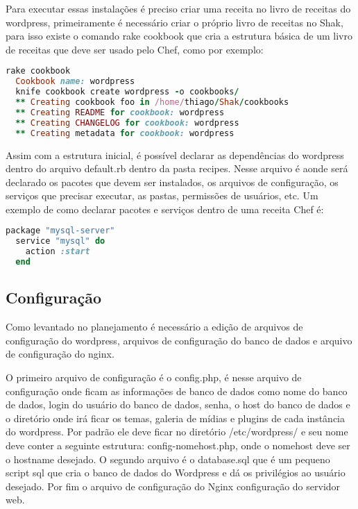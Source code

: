Para executar essas instalações é preciso criar uma receita no livro de receitas
do wordpress, primeiramente é necessário criar o próprio livro de receitas no Shak,
para isso existe o comando rake cookbook que cria a estrutura básica
de um livro de receitas que deve ser usado pelo Chef, como por exemplo:

\begin{lstlisting}[language=Ruby,label=dice_index,caption={Exemplo de criação de estrutura básica de livro de receitas do wordpress com shak}]
  rake cookbook
  Cookbook name: wordpress
  knife cookbook create wordpress -o cookbooks/
  ** Creating cookbook foo in /home/thiago/Shak/cookbooks
  ** Creating README for cookbook: wordpress
  ** Creating CHANGELOG for cookbook: wordpress
  ** Creating metadata for cookbook: wordpress
\end{lstlisting}

Assim com a estrutura inicial, é possível declarar as dependências do wordpress
dentro do arquivo default.rb dentro da pasta recipes. Nesse arquivo é aonde
será declarado os pacotes que devem ser instalados, os arquivos de configuração,
os serviços que precisar executar, as pastas, permissões de usuários, etc. Um exemplo
de como declarar pacotes e serviços dentro de uma receita Chef é:

\begin{lstlisting}[language=Ruby,label=dice_index,caption={Exemplo de criação de serviço do mysql com o chef}]
  package "mysql-server"
  service "mysql" do
    action :start
  end
\end{lstlisting}


\subsection{Configuração}
\label{wordpress:preparacao}

Como levantado no planejamento é necessário a edição de arquivos de configuração
do wordpress, arquivos de configuração do banco de dados e arquivo de configuração
do nginx.

O primeiro arquivo de configuração é o config.php, é nesse arquivo de
configuração onde ficam as informações de banco de dados como nome do banco de dados,
login do usuário do banco de dados, senha, o host do banco de dados e o diretório
onde irá ficar os temas, galeria de mídias e plugins de cada instância do wordpress.
Por padrão ele deve ficar no diretório /etc/wordpress/ e seu nome deve conter
a seguinte estrutura: config-nomehost.php, onde o nomehost deve ser o hostname
desejado. O segundo arquivo é o database.sql que é um pequeno script sql que
cria o banco de dados do Wordpress e dá os privilégios ao usuário desejado. Por fim
o arquivo de configuração do Nginx configuração do servidor web.

